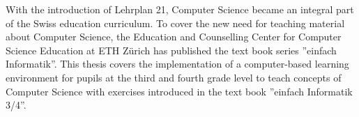 With the introduction of Lehrplan 21, Computer Science became an integral part of the Swiss education curriculum. To cover the new need for teaching material about Computer Science, the Education and Counselling Center for Computer Science Education at ETH Zürich has published the text book series ''einfach Informatik''. 
This thesis covers the implementation of a computer-based learning environment for pupils at the third and fourth grade level to teach concepts of Computer Science with exercises introduced in the text book ''einfach Informatik 3/4''.
